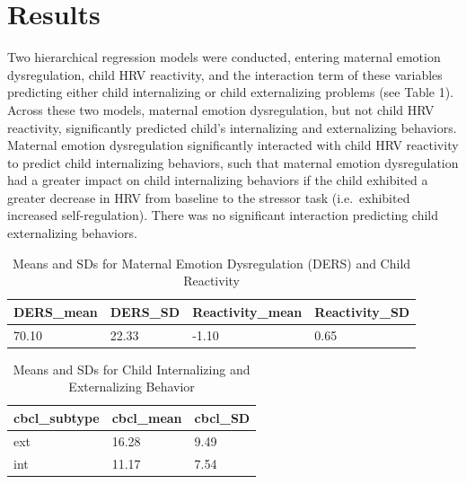 \documentclass[man]{apa6}
\begin{document}
\section{Results}\label{results}

Two hierarchical regression models were conducted, entering maternal
emotion dysregulation, child HRV reactivity, and the interaction term of
these variables predicting either child internalizing or child
externalizing problems (see Table 1). Across these two models, maternal
emotion dysregulation, but not child HRV reactivity, significantly
predicted child's internalizing and externalizing behaviors. Maternal
emotion dysregulation significantly interacted with child HRV reactivity
to predict child internalizing behaviors, such that maternal emotion
dysregulation had a greater impact on child internalizing behaviors if
the child exhibited a greater decrease in HRV from baseline to the
stressor task (i.e.~exhibited increased self-regulation). There was no
significant interaction predicting child externalizing behaviors.

\begin{table}[tbp]
\begin{center}
\begin{threeparttable}
\caption{\label{tab:descriptives ders and reactivity}Means and SDs for Maternal Emotion Dysregulation (DERS) and Child Reactivity}
\begin{tabular}{llll}
\toprule
DERS\_mean & \multicolumn{1}{c}{DERS\_SD} & \multicolumn{1}{c}{Reactivity\_mean} & \multicolumn{1}{c}{Reactivity\_SD}\\
\midrule
70.10 & 22.33 & -1.10 & 0.65\\
\bottomrule
\end{tabular}
\end{threeparttable}
\end{center}
\end{table}

\begin{table}[tbp]
\begin{center}
\begin{threeparttable}
\caption{\label{tab:descriptives cbcl}Means and SDs for Child Internalizing and Externalizing Behavior}
\begin{tabular}{lll}
\toprule
cbcl\_subtype & \multicolumn{1}{c}{cbcl\_mean} & \multicolumn{1}{c}{cbcl\_SD}\\
\midrule
ext & 16.28 & 9.49\\
int & 11.17 & 7.54\\
\bottomrule
\end{tabular}
\end{threeparttable}
\end{center}
\end{table}
\end{document}
